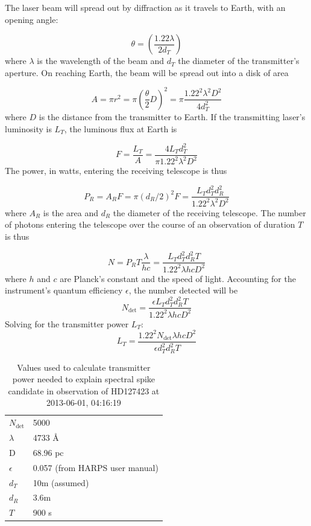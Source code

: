 \documentclass[linenumbers]{aastex631}
\begin{document}
The laser beam will spread out by diffraction as it travels to Earth, with an opening angle:

\begin{equation}
    \theta = (\frac{1.22\lambda}{2d_T})
\end{equation}
where $\lambda$ is the wavelength of the beam and $d_T$ the diameter of the transmitter's aperture.  On reaching Earth, the beam will be spread out into a disk of area

\begin{equation}
    A = \pi r^2 = \pi (\frac{\theta}{2} D)^2 = \pi \frac{1.22^2 \lambda^2 D^2}{4 d_T^2}
\end{equation}
where $D$ is the distance from the transmitter to Earth.  If the transmitting laser's luminosity is $L_T$, the luminous flux at Earth is

\begin{equation}
    F = \frac{L_T}{A} = \frac{4 L_T d_T^2}{\pi 1.22^2 \lambda^2 D^2}
\end{equation}
The power, in watts, entering the receiving telescope is thus

\begin{equation}
    P_R = A_R F = \pi (d_R/2)^2 F = \frac{L_T d_T^2 d_R^2}{1.22^2 \lambda^2 D^2}
\end{equation}
where $A_R$ is the area and $d_R$ the diameter of the receiving telescope.  The number of photons entering the telescope over the course of an observation of duration $T$ is thus

\begin{equation}
    N = P_R T \frac{\lambda}{h c} = \frac{L_T d_T^2 d_R^2 T}{1.22^2 \lambda h c D^2}
\end{equation}
where $h$ and $c$ are Planck's constant and the speed of light.  Accounting for the instrument's quantum efficiency $\epsilon$, the number detected will be
\begin{equation}
    N_{\mbox{det}} = \frac{\epsilon L_T d_T^2 d_R^2 T}{1.22^2 \lambda h c D^2}
\end{equation}
Solving for the transmitter power $L_T$:
\begin{equation}
    L_T = \frac{1.22^2 N_{\mbox{det}} \lambda h c D^2}{\epsilon d_T^2 d_R^2 T}
\end{equation}

\begin{table}[h]
\begin{tabular}{ll}
$N_{\mbox{det}}$ & 5000\\
$\lambda$ & 4733 \AA \\
D & 68.96 pc \\
$\epsilon$ & 0.057 (from HARPS user manual)\\
$d_T$ & 10m (assumed) \\
$d_R$ & 3.6m \\
$T$ & 900 s\\
\end{tabular}
\label{t:powervalues}
\caption{Values used to calculate transmitter power needed to explain spectral spike candidate in observation of HD127423 at 2013-06-01, 04:16:19}
\end{table}
\end{document}
